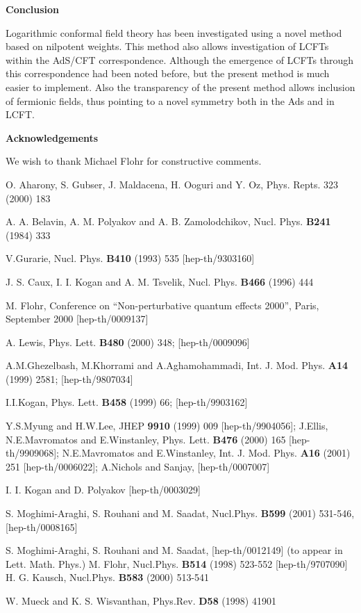 \documentclass[a4paper,11pt]{article}
\begin{document}
{\bf \Large Conclusion}

Logarithmic conformal field theory has been investigated using a
novel method based on nilpotent weights. This method also allows
investigation of LCFTs within the AdS/CFT correspondence. Although
the emergence of LCFTs through this correspondence had been noted
before, but the present method is much easier to implement. Also
the transparency of the present method allows inclusion of
fermionic fields, thus pointing to a novel symmetry both in the
Ads and in LCFT.

{\bf \Large Acknowledgements}

We wish to thank Michael Flohr for constructive comments.

\begin{thebibliography}{99}
  O. Aharony, S. Gubser, J. Maldacena, H. Ooguri and Y. Oz,
Phys. Repts. 323 (2000) 183

  A. A. Belavin, A. M. Polyakov and A. B. Zamolodchikov, Nucl.
Phys. \textbf{B241} (1984) 333

  V.Gurarie, Nucl. Phys. \textbf{B410} (1993) 535
[hep-th/9303160]

  J. S. Caux, I. I. Kogan and A. M. Tsvelik,
Nucl. Phys. \textbf{B466} (1996) 444

  M. Flohr, Conference on ``Non-perturbative quantum effects 2000'', Paris, September 2000
[hep-th/0009137]

  A. Lewis,
 Phys. Lett. \textbf{B480} (2000) 348;
    [hep-th/0009096]

 A.M.Ghezelbash, M.Khorrami and A.Aghamohammadi,
    Int. J. Mod. Phys. \textbf{A14} (1999) 2581;  [hep-th/9807034]

  I.I.Kogan,
    Phys. Lett. \textbf{B458} (1999) 66;  [hep-th/9903162]

 Y.S.Myung and H.W.Lee,
    JHEP \textbf{9910} (1999) 009   [hep-th/9904056];
J.Ellis, N.E.Mavromatos and E.Winstanley,
    Phys. Lett. \textbf{B476} (2000) 165 [hep-th/9909068];
N.E.Mavromatos and E.Winstanley,
    Int. J. Mod. Phys. \textbf{A16} (2001) 251  [hep-th/0006022];
A.Nichols and Sanjay,
   [hep-th/0007007]

  I. I. Kogan and D. Polyakov [hep-th/0003029]

 S. Moghimi-Araghi, S. Rouhani and M. Saadat, Nucl.Phys.
\textbf{B599} (2001) 531-546, [hep-th/0008165]

  S. Moghimi-Araghi, S. Rouhani and M. Saadat,
[hep-th/0012149] (to appear in Lett. Math. Phys.)
  M. Flohr, Nucl.Phys. \textbf{B514} (1998) 523-552 [hep-th/9707090]
  H. G. Kausch, Nucl.Phys. \textbf{B583} (2000) 513-541

 W. Mueck and K. S. Wisvanthan, Phys.Rev. \textbf{D58} (1998) 41901




\end{thebibliography}
\end{document}
